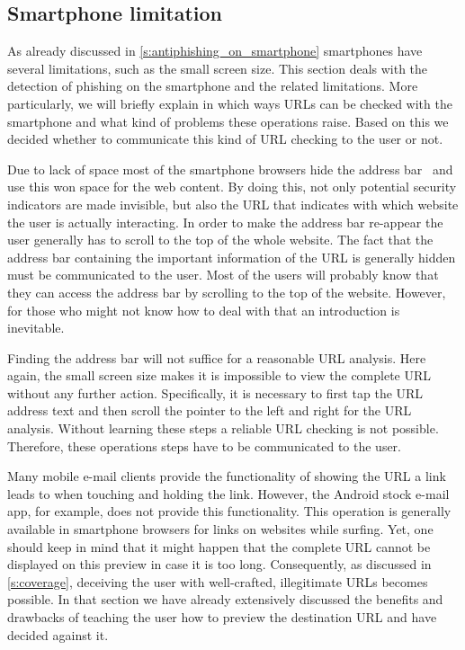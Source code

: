 \subsection{Smartphone limitation}
As already discussed in \autoref{s:antiphishing_on_smartphone} smartphones have several limitations, such as the small screen size. 
This section deals with the detection of phishing on the smartphone and the related limitations.
More particularly, we will briefly explain in which ways URLs can be checked with the smartphone and what kind of problems these operations raise.
Based on this we decided whether to communicate this kind of URL checking to the user or not.

\begin{description}[leftmargin=0cm]
	\item[Invisible Address Bar] Due to lack of space most of the smartphone browsers hide the address bar~\cite{amrutkar2012measuring} and use this won space for the web content. 
By doing this, not only potential security indicators are made invisible, but also the URL that indicates with which website the user is actually interacting.
In order to make the address bar re-appear the user generally has to scroll to the top of the whole website.
The fact that the address bar containing the important information of the URL is generally hidden must be communicated to the user.
Most of the users will probably know that they can access the address bar by scrolling to the top of the website.
However, for those who might not know how to deal with that an introduction is inevitable.

	\item[Analyze Complete URL Via Address Bar] Finding the address bar will not suffice for a reasonable URL analysis. 
Here again, the small screen size makes it is impossible to view the complete URL without any further action.
Specifically, it is necessary to first tap the URL address text and then scroll the pointer to the left and right for the URL analysis.
Without learning these steps a reliable URL checking is not possible. 
Therefore, these operations steps have to be communicated to the user.

	\item[Show URL Before Click] Many mobile e-mail clients provide the functionality of showing the URL a link leads to when touching and holding the link.
However, the Android stock e-mail app, for example, does not provide this functionality.
This operation is generally available in smartphone browsers for links on websites while surfing.
Yet, one should keep in mind that it might happen that the complete URL cannot be displayed on this preview in case it is too long. 
Consequently, as discussed in \autoref{s:coverage}, deceiving the user with well-crafted, illegitimate URLs becomes possible. 
In that section we have already extensively discussed the benefits and drawbacks of teaching the user how to preview the destination URL and have decided against it.


\end{description}
